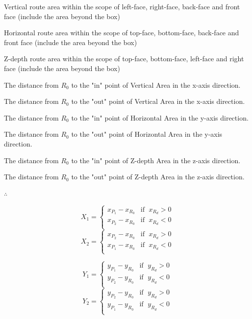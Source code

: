 \begin{description}
	\setlength{\parskip}{0pt}
	\item[$\bullet$ Vertical Area] Vertical route area within the scope of left-face, right-face, back-face and front face (include the area beyond the box)
	\item[$\bullet$ Horizontal Area] Horizontal route area within the scope of top-face, bottom-face, back-face and front face (include the area beyond the box)
	\item[$\bullet$ Z-depth Area] Z-depth route area within the scope of top-face, bottom-face, left-face and right face (include the area beyond the box)
	\item[$\bullet$ $\mathbf{X}_1$] The distance from $R_0$ to the "in" point of Vertical Area in the x-axis direction.   
	\item[$\bullet$ $\mathbf{X}_2$] The distance from $R_0$ to the "out" point of Vertical Area in the x-axis direction. 
	\item[$\bullet$ $\mathbf{Y}_1$] The distance from $R_0$ to the "in" point of Horizontal Area in the y-axis direction.
	\item[$\bullet$ $\mathbf{Y}_2$] The distance from $R_0$ to the "out" point of Horizontal Area in the y-axis direction. 
	\item[$\bullet$ $\mathbf{Z}_1$] The distance from $R_0$ to the "in" point of Z-depth Area in the z-axis direction.
	\item[$\bullet$ $\mathbf{Z}_2$] The distance from $R_0$ to the "out" point of Z-depth Area in the z-axis direction. 
\end{description}

$\therefore$

\begin{multicols}{2}
\noindent
	\[
	X_1 =
	\begin{cases}
	x_{P_1} - x_{R_0} & \text{if }\;x_{R_d} > 0\\
	x_{P_2} - x_{R_0} & \text{if }\;x_{R_d} < 0\\
	\end{cases}
	\]
\columnbreak
	\[
	X_2 =
	\begin{cases}
	x_{P_2} - x_{R_0} & \text{if }\;x_{R_d} > 0\\
	x_{P_1} - x_{R_0} & \text{if }\;x_{R_d} < 0\\
	\end{cases}
	\]
\end{multicols}

\begin{multicols}{2}
\noindent
	\[
	Y_1 =
	\begin{cases}
	y_{P_1} - y_{R_0} & \text{if }\;y_{R_d} > 0\\
	y_{P_2} - y_{R_0} & \text{if }\;y_{R_d} < 0\\
	\end{cases}
	\]
\columnbreak
	\[
	Y_2 =
	\begin{cases}
	y_{P_2} - y_{R_0} & \text{if }\;y_{R_d} > 0\\
	y_{P_1} - y_{R_0} & \text{if }\;y_{R_d} < 0\\
	\end{cases}
	\]
\end{multicols}

